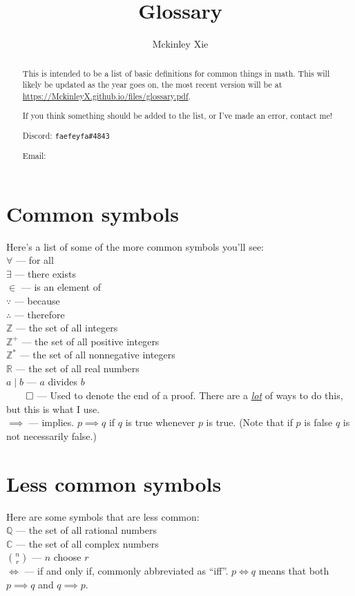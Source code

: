 \documentclass[a4paper]{scrartcl}
\title{Glossary}
\author{Mckinley Xie}
\newcommand{\term}[2]{\\$#1$  ---  #2}
\begin{document}
\maketitle
\begin{abstract}
	This is intended to be a list of basic definitions for common things in math. This will likely be updated as the year goes on, the most recent version will be at \url{https://MckinleyX.github.io/files/glossary.pdf}.

	If you think something should be added to the list, or I've made an error, contact me!

	Discord: \texttt{faefeyfa\#4843}

	Email: 
\end{abstract}
\section{Common symbols}
Here's a list of some of the more common symbols you'll see:
	\term{\forall}{for all} 
	\term{\exists}{there exists} 
	\term{\in}{is an element of}
	\term{\because}{because}
	\term{\therefore}{therefore}
	\term{\mathbb{Z}}{the set of all integers}
	\term{\mathbb{Z}^+}{the set of all positive integers}
	\term{\mathbb{Z}^*}{the set of all nonnegative integers}
	\term{\mathbb{R}}{the set of all real numbers}
	\term{a \mid b}{$a$ divides $b$}
	\term{\qed}{Used to denote the end of a proof. There are a \href{https://mathwithbaddrawings.com/2019/10/02/how-to-end-a-proof/}{\emph{lot}} of ways to do this, but this is what I use.}
	\term{\implies}{implies. $p \implies q$ if $q$ is true whenever $p$ is true. (Note that if $p$ is false $q$ is not necessarily false.)}
\section{Less common symbols}
Here are some symbols that are less common:
	\term{\mathbb{Q}}{the set of all rational numbers}
	\term{\mathbb{C}}{the set of all complex numbers}
	\term{\binom{n}{r}}{$n$ choose $r$}
	\term{\iff}{if and only if, commonly abbreviated as ``iff''. $p \iff q$ means that both $p \implies q$ and $q \implies p$.}
\end{document}
